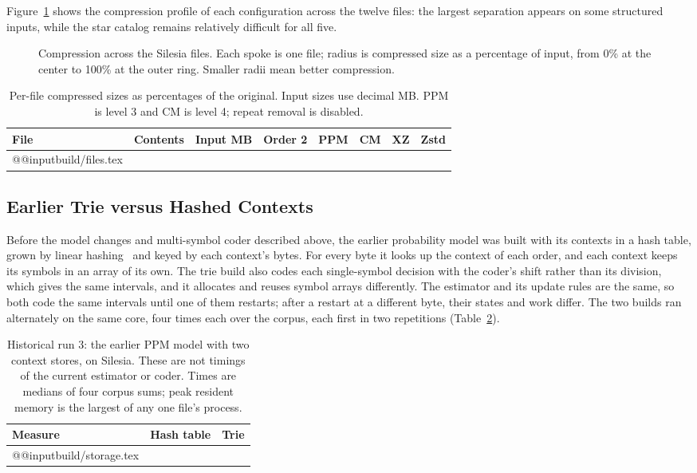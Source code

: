 \documentclass[10pt,letterpaper]{article}
\begin{document}
Figure~\ref{fig:kiviat} shows the compression profile of each configuration across the twelve files: the largest separation appears on some structured inputs, while the star catalog remains relatively difficult for all five.

\begin{figure}[htbp]
\centering

\caption{Compression across the Silesia files. Each spoke is one file; radius is compressed size as a percentage of input, from 0\% at the center to 100\% at the outer ring. Smaller radii mean better compression.}\label{fig:kiviat}
\end{figure}

\begin{table}[htbp]
\centering
\caption{Per-file compressed sizes as percentages of the original. Input sizes use decimal MB. PPM is level 3 and CM is level 4; repeat removal is disabled.}\label{tab:files}
\medskip
\small
\begin{tabular}{@{}llrrrrrr@{}}
\toprule
File & Contents & Input MB & Order 2 & PPM & CM & XZ & Zstd\\
\midrule
\csname @@input\endcsname build/files.tex
\bottomrule
\end{tabular}
\end{table}

\FloatBarrier
\subsection{Earlier Trie versus Hashed Contexts}\label{sec:storage-eval}
Before the model changes and multi-symbol coder described above, the earlier probability model was built with its contexts in a hash table, grown by linear hashing~\cite{litwin} and keyed by each context's bytes. For every byte it looks up the context of each order, and each context keeps its symbols in an array of its own. The trie build also codes each single-symbol decision with the coder's shift rather than its division, which gives the same intervals, and it allocates and reuses symbol arrays differently. The estimator and its update rules are the same, so both code the same intervals until one of them restarts; after a restart at a different byte, their states and work differ. The two builds ran alternately on the same core, four times each over the corpus, each first in two repetitions (Table~\ref{tab:storage}).

\begin{table}[htbp]
\centering
\caption{Historical run 3: the earlier PPM model with two context stores, on Silesia. These are not timings of the current estimator or coder. Times are medians of four corpus sums; peak resident memory is the largest of any one file's process.}\label{tab:storage}
\medskip
\begin{tabular}{@{}lrr@{}}
\toprule
Measure & Hash table & Trie\\
\midrule
\csname @@input\endcsname build/storage.tex
\bottomrule
\end{tabular}
\end{table}
\end{document}
